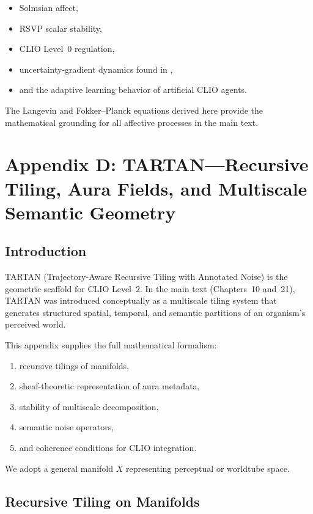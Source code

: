 \documentclass[12pt,oneside]{book}
\theoremstyle{plain}
\theoremstyle{definition}
\begin{document}
\begin{itemize}
    \item Solmsian affect,
    \item RSVP scalar stability,
    \item CLIO Level~0 regulation,
    \item uncertainty-gradient dynamics found in \cite{Cheng2025CognitiveLV},
    \item and the adaptive learning behavior of artificial CLIO agents.
\end{itemize}

The Langevin and Fokker--Planck equations derived here provide the mathematical
grounding for all affective processes in the main text.

\chapter{Appendix D: TARTAN---Recursive Tiling, Aura Fields, and Multiscale Semantic Geometry}
\label{appendix:TARTAN}

\section{Introduction}

TARTAN (Trajectory-Aware Recursive Tiling with Annotated Noise) is the
geometric scaffold for CLIO Level~2.
In the main text (Chapters~10 and~21), TARTAN was introduced conceptually as a
multiscale tiling system that generates structured spatial, temporal, and
semantic partitions of an organism’s perceived world.

This appendix supplies the full mathematical formalism:

\begin{enumerate}
    \item recursive tilings of manifolds,
    \item sheaf-theoretic representation of aura metadata,
    \item stability of multiscale decomposition,
    \item semantic noise operators,
    \item and coherence conditions for CLIO integration.
\end{enumerate}

We adopt a general manifold $X$ representing perceptual or worldtube space.

\section{Recursive Tiling on Manifolds}
\end{document}
